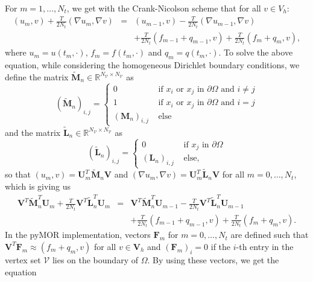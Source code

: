For $m=1,\dotsc,N_t$, we get with the Crank-Nicolson scheme that for all $v\in V_h$:
\begin{eqnarray*}
(u_m,v) + \frac{T}{2N_t}(\nabla u_m, \nabla v) & = &(u_{m-1},v) - \frac{T}{2N_t}(\nabla u_{m-1}, \nabla v)\\
&& + \frac{T}{2N_t}(f_{m-1} + q_{m-1}, v) + \frac{T}{2N_t}(f_m + q_m, v),
\end{eqnarray*}
where $u_m=u(t_m, \cdot)$, $f_m=f(t_m, \cdot)$ and $q_m=q(t_m,\cdot)$. To solve the above equation, while considering the homogeneous Dirichlet boundary conditions, we define the matrix $\tilde{\mathbf{M}}_n\in\mathbb{R}^{N_\mathcal{V}\times N_\mathcal{V}}$ as
\begin{displaymath}
\left(\tilde{\mathbf{M}}_n\right)_{i,j}=\begin{cases}
0 & \text{ if $x_i$ or $x_j$ in $\partial\Omega$ and $i \neq j$}\\
1 & \text{ if $x_i$ or $x_j$ in $\partial\Omega$ and $i = j$}\\
\left(\mathbf{M}_n\right)_{i,j} & \text{ else}
\end{cases}
\end{displaymath}
and the matrix $\tilde{\mathbf{L}}_n\in\mathbb{R}^{N_\mathcal{V}\times N_\mathcal{V}}$ as
\begin{displaymath}
\left(\tilde{\mathbf{L}}_n\right)_{i,j}=\begin{cases}
0 & \text{ if $x_j$ in $\partial\Omega$}\\
\left(\mathbf{L}_n\right)_{i,j} & \text{ else,}
\end{cases}
\end{displaymath}
so that $(u_m,v)=\mathbf{U}_m^T\tilde{\mathbf{M}}_n\mathbf{V}$ and $(\nabla u_m,\nabla v)=\mathbf{U}_m^T\tilde{\mathbf{L}}_n\mathbf{V}$ for all $m=0,\dotsc,N_t$, which is giving us
\begin{eqnarray*}
\mathbf{V}^T\tilde{\mathbf{M}}_n^T\mathbf{U}_m + \frac{T}{2N_t} \mathbf{V}^T\tilde{\mathbf{L}}_n^T \mathbf{U}_m &=& \mathbf{V}^T\tilde{\mathbf{M}}_n^T\mathbf{U}_{m-1} - \frac{T}{2N_t} \mathbf{V}^T\tilde{\mathbf{L}}_n^T \mathbf{U}_{m-1}\\
&&  + \frac{T}{2N_t}(f_{m-1} + q_{m-1}, v) + \frac{T}{2N_t}(f_m + q_m, v).
\end{eqnarray*}
In the pyMOR implementation, vectors $\mathbf{F}_m$ for $m=0,\dotsc,N_t$ are defined such that $\mathbf{V}^T\mathbf{F}_m\approx(f_m + q_m, v)$ for all $v\in \mathbf{V}_h$ and $\left(\mathbf{F}_m\right)_i=0$ if the $i$-th entry in the vertex set $\mathcal{V}$ lies on the boundary of $\Omega$. By using these vectors, we get the equation
